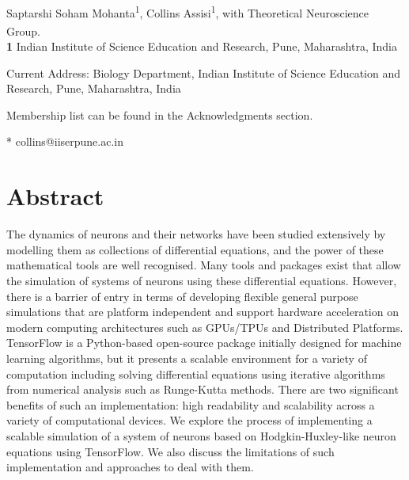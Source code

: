 \documentclass[10pt,letterpaper]{article}
\begin{document}
\vspace*{0.2in}

\begin{flushleft}
{\Large
\textbf{} %
}
\newline
\\
Saptarshi Soham Mohanta\textsuperscript{1},
Collins Assisi\textsuperscript{1},
with Theoretical Neuroscience Group\textsuperscript{\textpilcrow}.
\\
\bigskip
\textbf{1} Indian Institute of Science Education and Research, Pune, Maharashtra, India
\\
\bigskip


\textcurrency Current Address: Biology Department, Indian Institute of Science Education and Research, Pune, Maharashtra, India 

\textpilcrow Membership list can be found in the Acknowledgments section.

* collins@iiserpune.ac.in

\end{flushleft}
\section*{Abstract}
The dynamics of neurons and their networks have been studied extensively by modelling them as collections of differential equations, and the power of these mathematical tools are well recognised. Many tools and packages exist that allow the simulation of systems of neurons using these differential equations. However, there is a barrier of entry in terms of developing flexible general purpose simulations that are platform independent and support hardware acceleration on modern computing architectures such as GPUs/TPUs and Distributed Platforms. TensorFlow is a Python-based open-source package initially designed for machine learning algorithms, but it presents a scalable environment for a variety of computation including solving differential equations using iterative algorithms from numerical analysis such as Runge-Kutta methods. There are two significant benefits of such an implementation: high readability and scalability across a variety of computational devices. We explore the process of implementing a scalable simulation of a system of neurons based on Hodgkin-Huxley-like neuron equations using TensorFlow. We also discuss the limitations of such implementation and approaches to deal with them. 
\end{document}
